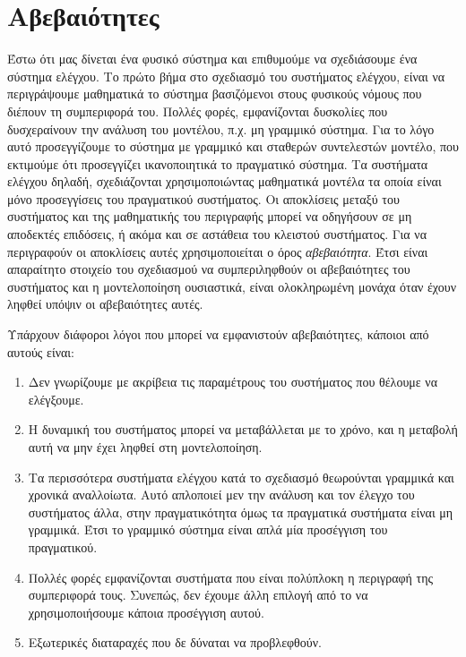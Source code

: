 \chapter{Αβεβαιότητες}\label{ch:uncert}
Έστω ότι μας δίνεται ένα φυσικό σύστημα και επιθυμούμε να σχεδιάσουμε ένα σύστημα
ελέγχου. Το πρώτο βήμα στο σχεδιασμό του συστήματος ελέγχου, είναι να περιγράψουμε
μαθηματικά το σύστημα βασιζόμενοι στους φυσικούς νόμους που διέπουν τη συμπεριφορά του.
Πολλές φορές, εμφανίζονται δυσκολίες που δυσχεραίνουν την ανάλυση του μοντέλου, π.χ.
μη γραμμικό σύστημα.  Για το λόγο αυτό προσεγγίζουμε το σύστημα με γραμμικό και
σταθερών συντελεστών μοντέλο, που εκτιμούμε ότι προσεγγίζει ικανοποιητικά το πραγματικό
σύστημα. Τα συστήματα ελέγχου δηλαδή, σχεδιάζονται χρησιμοποιώντας μαθηματικά μοντέλα
τα οποία είναι μόνο προσεγγίσεις του πραγματικού συστήματος. Οι αποκλίσεις μεταξύ του
συστήματος και της μαθηματικής του περιγραφής μπορεί να οδηγήσουν σε μη
αποδεκτές επιδόσεις, ή ακόμα και σε αστάθεια του κλειστού συστήματος. Για να
περιγραφούν οι αποκλίσεις αυτές χρησιμοποιείται ο όρος \emph{αβεβαιότητα}.
Έτσι είναι απαραίτητο στοιχείο του σχεδιασμού να συμπεριληφθούν οι αβεβαιότητες του
συστήματος και η μοντελοποίηση ουσιαστικά, είναι ολοκληρωμένη μονάχα όταν έχουν ληφθεί
υπόψιν οι αβεβαιότητες αυτές.

Υπάρχουν διάφοροι λόγοι που μπορεί να εμφανιστούν αβεβαιότητες, κάποιοι από
αυτούς είναι:
\begin{enumerate} [label = (\enumgreek*)]
    \item Δεν γνωρίζουμε με ακρίβεια τις παραμέτρους του συστήματος που θέλουμε
        να ελέγξουμε.
    \item Η δυναμική του συστήματος μπορεί να μεταβάλλεται με το χρόνο, και η
        μεταβολή αυτή να μην έχει ληφθεί στη μοντελοποίηση.
    \item Τα περισσότερα συστήματα ελέγχου κατά το σχεδιασμό θεωρούνται γραμμικά
        και χρονικά αναλλοίωτα. Αυτό απλοποιεί μεν την ανάλυση και τον έλεγχο
        του συστήματος άλλα, στην πραγματικότητα όμως τα πραγματικά συστήματα
        είναι μη γραμμικά. Έτσι το γραμμικό σύστημα είναι απλά μία προσέγγιση
        του πραγματικού.
    \item Πολλές φορές εμφανίζονται συστήματα που είναι πολύπλοκη η
        περιγραφή της συμπεριφορά τους. Συνεπώς, δεν έχουμε άλλη επιλογή από
        το να χρησιμοποιήσουμε κάποια προσέγγιση αυτού.
    \item Εξωτερικές διαταραχές που δε δύναται να προβλεφθούν.
\end{enumerate}

